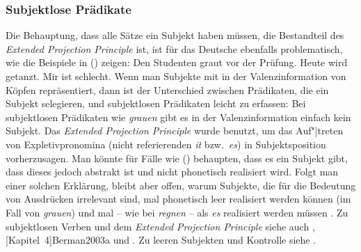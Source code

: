 \subsubsection{Subjektlose Prädikate}
\label{sec-subjekt-valenz}

Die Behauptung, dass alle Sätze ein Subjekt haben müssen, die Bestandteil des
\emph{Extended Projection Principle} ist,
ist für das Deutsche ebenfalls problematisch,
wie die Beispiele in () zeigen:
\largerpage
\eal
{}
\ex Den Studenten graut vor der Prüfung.
\ex Heute wird getanzt.
\ex Mir ist schlecht. 
\zl
Wenn man Subjekte mit in der Valenzinformation von Köpfen repräsentiert, dann
ist der Unterschied zwischen Prädikaten, die ein Subjekt selegieren, und subjektlosen
Prädikaten leicht zu erfassen: Bei subjektlosen Prädikaten wie \emph{grauen}
gibt es in der Valenzinformation einfach kein Subjekt.
Das \emph{Extended Projection Principle} wurde benutzt, um das Auf"|treten von Expletivpronomina
(nicht referierenden \emph{it} bzw.\ \emph{es}) in Subjektsposition vorherzusagen.
Man könnte für Fälle wie () behaupten, dass es ein Subjekt gibt, dass
dieses jedoch abstrakt ist und nicht phonetisch realisiert wird. Folgt
man einer solchen Erklärung, bleibt aber offen, warum Subjekte, die für
die Bedeutung von Ausdrücken irrelevant sind, mal phonetisch leer realisiert werden
können (im Fall von \emph{grauen}) und mal -- wie bei \emph{regnen} --
als \emph{es} realisiert werden müssen \citep[]{Fanselow91a}. 
Zu subjektlosen Verben und dem
\emph{Extended Projection Principle} siehe auch , 
[Kapitel~4]{Berman2003a} und .
Zu leeren Subjekten und Kontrolle siehe .

